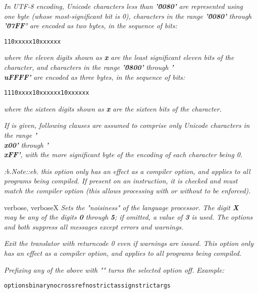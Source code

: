 \begin{description}
\emph{In UTF-8 encoding, Unicode characters less than \textbf{'\u0080'} are
represented using one byte (whose most-significant bit is 0), characters
in the range \textbf{'\u0080'} through \textbf{'\u07FF'} are encoded
as two bytes, in the sequence of bits:}
\begin{alltt}
110xxxxx 10xxxxxx
\end{alltt}
\emph{where the eleven digits shown as \textbf{x} are the least
significant eleven bits of the character, and characters in the
range \textbf{'\u0800'} through \textbf{'\\uFFFF'} are encoded as
three bytes, in the sequence of bits:}
\begin{alltt}
1110xxxx 10xxxxxx 10xxxxxx
\end{alltt}
\emph{where the sixteen digits shown as \textbf{x} are the
sixteen bits of the character.}
 
\emph{If  is given, following clauses are assumed to comprise
only Unicode characters in the range \textbf{'\\x00'}
through \textbf{'\\xFF'}, with the more significant byte of the
encoding of each character being 0.}
 
\emph{:b.Note::eb.
this option only has an effect as a compiler option, and applies to
all programs being compiled.  If present on an 
instruction, it is checked and must match the compiler option (this
allows processing with or without  to be
enforced).}
\item{verbose, verboseX}
\emph{Sets the "noisiness" of the language processor.
The digit \textbf{\emph{X}} may be any of the digits \textbf{0}
through \textbf{5}; if omitted, a value of \textbf{3} is used.
The options  and  both suppress all
messages except errors and warnings.}

\item[warnexit0]
\emph{Exit the translator with returncode 0 even if warnings are issued. This option only has an effect as a compiler option, and applies to all programs being compiled.}
\end{description}
 
\emph{Prefixing any of the above with "" turns the selected
option off.}
 \emph{Example:}
\begin{alltt}
options binary nocrossref nostrictassign strictargs
\end{alltt}
 
